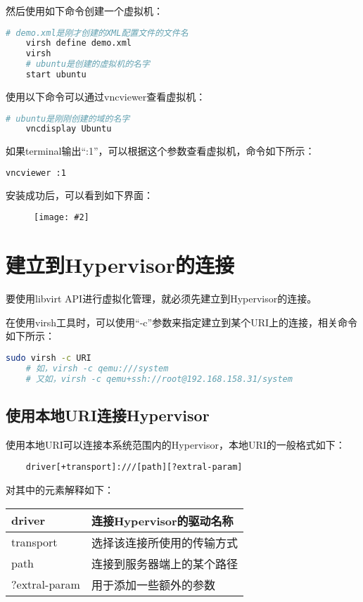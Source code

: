 \documentclass[a4paper,left=2.5cm,right=2.5cm,11pt]{article}
\newcommand{\sizedfic}[2]{\begin{figure}[H]
		\center
		\texttt{[image: \#2]}
	\end{figure}}
\begin{document}
	然后使用如下命令创建一个虚拟机：
	\begin{lstlisting}[language = bash]
	# demo.xml是刚才创建的XML配置文件的文件名
	virsh define demo.xml
	virsh
	# ubuntu是创建的虚拟机的名字
	start ubuntu
	\end{lstlisting}

	使用以下命令可以通过vncviewer查看虚拟机：
	\begin{lstlisting}[language = bash]
	# ubuntu是刚刚创建的域的名字
	vncdisplay Ubuntu
	\end{lstlisting}

	如果terminal输出“:1”，可以根据这个参数查看虚拟机，命令如下所示：
	\begin{lstlisting}[language = bash]
	vncviewer :1
	\end{lstlisting}

	安装成功后，可以看到如下界面：
	\sizedfic{0.5}{5.png}
	
\clearpage

\section{建立到Hypervisor的连接}
	要使用libvirt API进行虚拟化管理，就必须先建立到Hypervisor的连接。\par
	在使用virsh工具时，可以使用“-c”参数来指定建立到某个URI上的连接，相关命令如下所示：
	\begin{lstlisting}[language = bash]
	sudo virsh -c URI
	# 如，virsh -c qemu:///system
	# 又如，virsh -c qemu+ssh://root@192.168.158.31/system
	\end{lstlisting}

\subsection{使用本地URI连接Hypervisor}
	使用本地URI可以连接本系统范围内的Hypervisor，本地URI的一般格式如下：
	\begin{lstlisting}
	driver[+transport]:///[path][?extral-param]
	\end{lstlisting}

	对其中的元素解释如下：
	\begin{longtable}{p{2.5cm}p{10cm}}
	\hline
	driver & 连接Hypervisor的驱动名称 \\
	\hline
	transport & 选择该连接所使用的传输方式 \\
	\hline
	path & 连接到服务器端上的某个路径 \\
	\hline
	?extral-param & 用于添加一些额外的参数 \\
	\hline
	\end{longtable}
\end{document}
